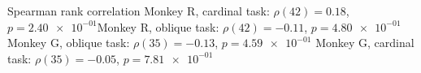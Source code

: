 Spearman rank correlation Monkey R, cardinal task: $\rho(42) = 0.18$, $p = \num{2.40e-01}$Monkey R, oblique task: $\rho(42) = -0.11$, $p = \num{4.80e-01}$ Monkey G, oblique task: $\rho(35) = -0.13$, $p = \num{4.59e-01}$ Monkey G, cardinal task: $\rho(35) = -0.05$, $p = \num{7.81e-01}$